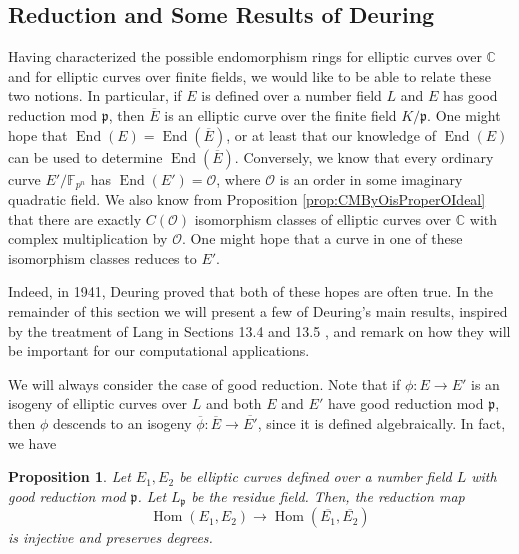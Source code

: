 \documentclass{amsart}
\newtheorem{prop}[thm]{Proposition}
\theoremstyle{definition}
\theoremstyle{remark}
\numberwithin{equation}{section}
\newcommand{\cO}{\mathcal O}
\newcommand{\fkp}{\mathfrak p}
\newcommand{\bbC}{\mathbb C}
\newcommand{\bbF}{\mathbb F}
\DeclareMathOperator{\End}{End}
\DeclareMathOperator{\Hom}{Hom}
\begin{document}
\subsection{Reduction and Some Results of Deuring} \label{subsec:EndRingUnderReduction}

 Having characterized the possible endomorphism rings for elliptic curves over $\bbC$ and for elliptic curves over finite fields, we would like to be able to relate these two notions. In particular, if $E$ is defined over a number field $L$ and $E$ has good reduction mod $\fkp$, then $\overline{E}$ is an elliptic curve over the finite field $K/\fkp$. One might hope that $\End(E) = \End(\overline{E})$, or at least that our knowledge of $\End(E)$ can be used to determine $\End(\overline{E})$. Conversely, we know that every ordinary curve $E'/\bbF_{p^n}$ has $\End(E') = \cO$, where $\cO$ is an order in some imaginary quadratic field. We also know from Proposition \ref{prop:CMByOisProperOIdeal}
 that there are exactly $C(\cO)$ isomorphism classes of elliptic curves over $\bbC$ with complex multiplication by $\cO$. One might hope that a curve in one of these isomorphism classes reduces to $E'$. 

Indeed, in 1941, Deuring proved that both of these hopes are often true. In the remainder of this section we will present a few of Deuring's main results, inspired by the treatment of Lang in Sections 13.4 and 13.5 \cite{LangEF}, and remark on how they will be important for our computational applications. %

We will always consider the case of good reduction. Note that if $\phi: E \to E'$ is an isogeny of elliptic curves over $L$ and both $E$ and $E'$ have good reduction mod $\fkp$, then $\phi$ descends to an isogeny $\overline{\phi}: \overline{E} \to \overline{E'}$, since it is defined algebraically. In fact, we have

\begin{prop} \label{prop:ReductionOfHomIsInjective}
Let $E_1,E_2$ be elliptic curves defined over a number field $L$ with good reduction mod $\fkp$. Let $L_{\fkp}$ be the residue field. Then, the reduction map
\[
\Hom(E_{1}, E_{2}) \to \Hom(\overline{E_{1}}, \overline{E_{2}})
\]
is injective and preserves degrees.
\end{prop}
\end{document}
